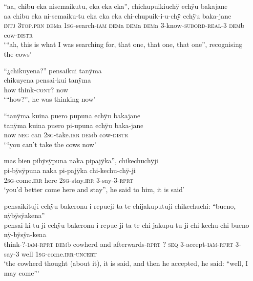 \ea%
\begingl 
\glpreamble “aa, chibu eka nisemaikutu, eka eka eka”, chichupuikiuchÿ echÿu bakajane\\
\gla aa chibu eka ni-semaiku-tu eka eka eka chi-chupuik-i-u-chÿ echÿu baka-jane\\ 
\glb \textsc{intj} 3\textsc{top.prn} \textsc{dem}a 1\textsc{sg}-search-\textsc{iam} \textsc{dem}a \textsc{dem}a \textsc{dem}a 3-know-\textsc{subord}-\textsc{real}-3 \textsc{dem}b cow-\textsc{distr}\\ 
\glft ‘“ah, this is what I was searching for, that one, that one, that one”, recognising the cows’\\ 
\endgl
\xe


\ea%
\begingl 
\glpreamble “¿chikuyena?” pensaikui tanÿma\\
\gla chikuyena pensai-kui tanÿma\\ 
\glb how think-\textsc{cont}? now\\ 
\glft ‘“how?”, he was thinking now’\\ 
\endgl
\xe

\ea%
\begingl 
\glpreamble “tanÿma kuina puero pupuna echÿu bakajane\\
\gla tanÿma kuina puero pi-upuna echÿu baka-jane\\ 
\glb now \textsc{neg} can 2\textsc{sg}-take.\textsc{irr} \textsc{dem}b cow-\textsc{distr}\\ 
\glft ‘“you can’t take the cows now’\\ 
\endgl
\xe

\ea%
\begingl 
\glpreamble mas bien pibÿsÿpuna naka pipajÿka”, chikechuchÿji\\
 pi-bÿsÿpuna naka pi-pajÿka chi-kechu-chÿ-ji\\ 
 2\textsc{sg}-come.\textsc{irr} here 2\textsc{sg}-stay.\textsc{irr} 3-say-3-\textsc{rprt}\\ 
\glft ‘you’d better come here and stay”, he said to him, it is said’\\ 
\endgl
\xe

\ea%
\begingl 
\glpreamble pensaikituji echÿu bakeronu i repueji ta te chijakuputuji chikechuchi: “bueno, nÿbÿsÿakena”\\
\gla pensai-ki-tu-ji echÿu bakeronu i repue-ji ta te chi-jakupu-tu-ji chi-kechu-chi bueno nÿ-bÿsÿa-kena\\ 
\glb think-?-\textsc{iam}-\textsc{rprt} \textsc{dem}b cowherd and afterwards-\textsc{rprt} ? \textsc{seq} 3-accept-\textsc{iam}-\textsc{rprt} 3-say-3 well 1\textsc{sg}-come.\textsc{irr}-\textsc{uncert}\\ 
\glft ‘the cowherd thought (about it), it is said, and then he accepted, he said: “well, I may come”’\\ 
\endgl
\xe

